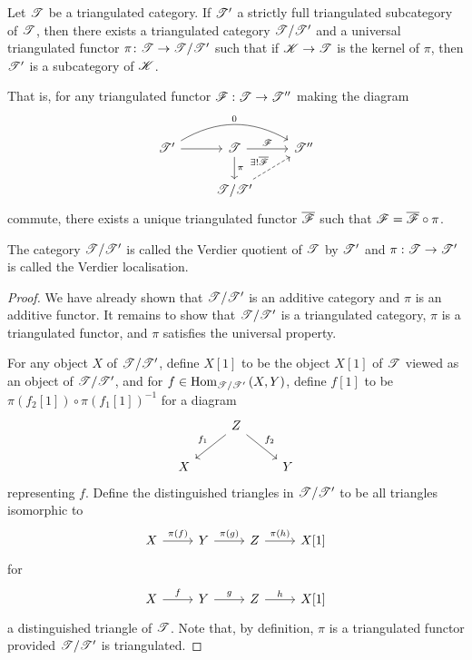 \documentclass[dissertation.tex]{subfiles}
\begin{document}
\begin{thm}[\cite{NeemanTCats}]
  Let $\mathscr{T}$ be a triangulated category.
  If $\mathscr{T}^\prime$ a strictly full triangulated subcategory of $\mathscr{T}$, then there exists a triangulated category $\mathscr{T}/\mathscr{T}^\prime$ and a universal triangulated functor $\pi \colon \mathscr{T} \rightarrow \mathscr{T}/\mathscr{T}^\prime$ such that if $\mathscr{K} \rightarrow \mathscr{T}$ is the kernel of $\pi$, then $\mathscr{T}^\prime$ is a subcategory of $\mathscr{K}$.

  That is, for any triangulated functor $\mathscr{F} : \mathscr{T} \rightarrow \mathscr{T}^{\prime\prime}$ making the diagram
  $$\begin{tikzcd}
    \T^\prime \arrow{r}\arrow[bend left]{rr}{0} & \T \arrow{d}{\pi}\arrow{r}{\F} & \T^{\prime\prime}\\
    & \T/\T^\prime \arrow[dashed]{ur}{\exists !\overline{\F}}
  \end{tikzcd}$$
  commute, there exists a unique triangulated functor $\overline{\mathscr{F}}$ such that $\mathscr{F} = \overline{\mathscr{F}} \circ \pi$.
  
  The category $\mathscr{T}/\mathscr{T}^\prime$ is called the Verdier quotient of $\mathscr{T}$ by $\mathscr{T}^\prime$ and $\pi : \mathscr{T} \rightarrow \mathscr{T}^\prime$ is called the Verdier localisation.
  
  \begin{proof}
    We have already shown that $\mathscr{T}/\mathscr{T}^\prime$ is an additive category and $\pi$ is an additive functor.
    It remains to show that $\mathscr{T}/\mathscr{T}^\prime$ is a triangulated category, $\pi$ is a triangulated functor, and $\pi$ satisfies the universal property.
    
    For any object $X$ of $\mathscr{T}/\mathscr{T}^\prime$, define $X[1]$ to be the object $X[1]$ of $\mathscr{T}$ viewed as an object of $\mathscr{T}/\mathscr{T}^\prime$, and for $f \in \operatorname{Hom}_{\mathscr{T}/\mathscr{T}^\prime}\left(X,Y\right)$, define $f[1]$ to be $\pi(f_2[1]) \circ \pi(f_1[1])^{-1}$ for a diagram
    $$\begin{tikzcd}
      & Z \arrow[swap]{ld}{f_1}\arrow{rd}{f_2}\\
      X & & Y
    \end{tikzcd}$$
    representing $f$.
    Define the distinguished triangles in $\mathscr{T}/\mathscr{T}^\prime$ to be all triangles isomorphic to 
    $$\begin{tikzcd}
      X \arrow{r}{\pi(f)} & Y \arrow{r}{\pi(g)} & Z \arrow{r}{\pi(h)} & X[1]
    \end{tikzcd}$$
    for
    $$\begin{tikzcd}
      X \arrow{r}{f} & Y \arrow{r}{g} & Z \arrow{r}{h} & X[1]
    \end{tikzcd}$$
    a distinguished triangle of $\mathscr{T}$.
    Note that, by definition, $\pi$ is a triangulated functor provided $\mathscr{T}/\mathscr{T}^\prime$ is triangulated.
    

\end{proof}
\end{thm}
\end{document}
